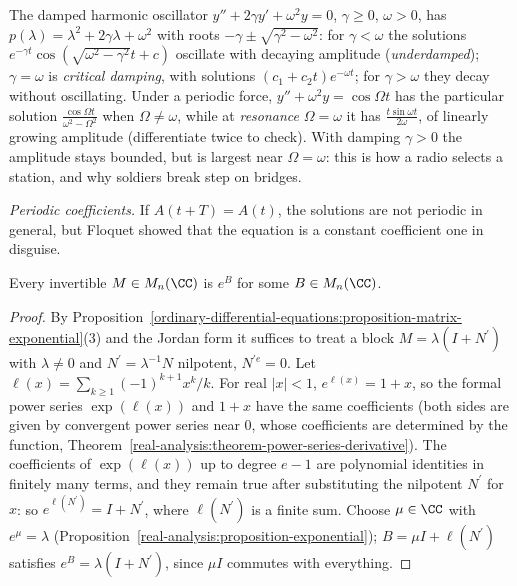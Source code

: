 \begin{example}\label{ordinary-differential-equations:example-oscillator}
The damped harmonic oscillator $y'' + 2\gamma y' + \omega^2y = 0$, $\gamma \geq 0$, $\omega > 0$, has $p(\lambda) = \lambda^2 + 2\gamma\lambda + \omega^2$ with roots $-\gamma \pm \sqrt{\gamma^2 - \omega^2}$: for $\gamma < \omega$ the solutions
$e^{-\gamma t}\cos(\sqrt{\omega^2 - \gamma^2}t + c)$ oscillate with decaying amplitude (\emph{underdamped}); $\gamma = \omega$ is \emph{critical damping}, with solutions $(c_1 + c_2t)e^{-\omega t}$; for $\gamma > \omega$ they decay without
oscillating. Under a periodic force, $y'' + \omega^2y = \cos\Omega t$ has the particular solution $\frac{\cos\Omega t}{\omega^2 - \Omega^2}$ when $\Omega \neq \omega$, while at \emph{resonance} $\Omega = \omega$ it has
$\frac{t\sin\omega t}{2\omega}$, of linearly growing amplitude (differentiate twice to check). With damping $\gamma > 0$ the amplitude stays bounded, but is largest near $\Omega = \omega$: this is how a radio selects a station,
and why soldiers break step on bridges.
\end{example}

\emph{Periodic coefficients.} If $A(t + T) = A(t)$, the solutions are not periodic in general, but Floquet showed that the equation is a constant coefficient one in disguise.

\begin{lemma}\label{ordinary-differential-equations:lemma-logarithm}
Every invertible $M \in M_n(\CC)$ is $e^B$ for some $B \in M_n(\CC)$.
\end{lemma}

\begin{proof}
By Proposition~\ref{ordinary-differential-equations:proposition-matrix-exponential}(3) and the Jordan form it suffices to treat a block $M = \lambda(I + N^{\prime})$ with $\lambda \neq 0$ and $N^{\prime} = \lambda^{-1}N$ nilpotent, $N^{\prime e} = 0$.
Let $\ell(x) = \sum_{k \geq 1}(-1)^{k+1}x^k/k$. For real $|x| < 1$, $e^{\ell(x)} = 1 + x$, so the formal power series $\exp(\ell(x))$ and $1 + x$ have the same coefficients (both sides are given by convergent power series near $0$,
whose coefficients are determined by the function, Theorem~\ref{real-analysis:theorem-power-series-derivative}). The coefficients of $\exp(\ell(x))$ up to degree $e - 1$ are polynomial identities in finitely many terms, and they
remain true after substituting the nilpotent $N^{\prime}$ for $x$: so $e^{\ell(N^{\prime})} = I + N^{\prime}$, where $\ell(N^{\prime})$ is a finite sum. Choose $\mu \in \CC$ with $e^\mu = \lambda$ (Proposition~\ref{real-analysis:proposition-exponential});
$B = \mu I + \ell(N^{\prime})$ satisfies $e^B = \lambda(I + N^{\prime})$, since $\mu I$ commutes with everything.
\end{proof}

